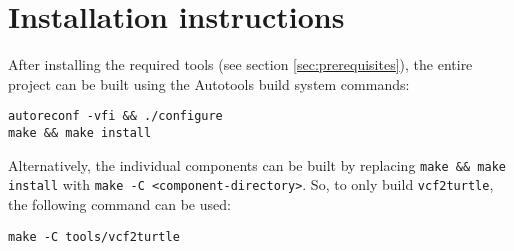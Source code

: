 \section{Installation instructions}

After installing the required tools (see section \ref{sec:prerequisites}), the
entire project can be built using the Autotools build system commands:
\begin{siderules}
\begin{verbatim}
autoreconf -vfi && ./configure
make && make install
\end{verbatim}
\end{siderules}

Alternatively, the individual components can be built by replacing
\texttt{make \&\& make install} with \texttt{make -C <component-directory>}.
So, to only build \texttt{vcf2turtle}, the following command can be used:
\begin{siderules}
\begin{verbatim}
make -C tools/vcf2turtle
\end{verbatim}
\end{siderules}
